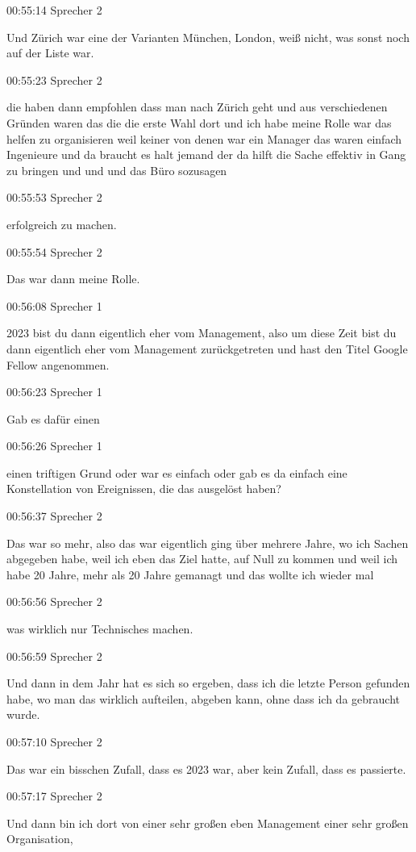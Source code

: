 00:55:14 Sprecher 2

Und Zürich war eine der Varianten München, London, weiß nicht, was sonst
noch auf der Liste war.

00:55:23 Sprecher 2

die haben dann empfohlen dass man nach Zürich geht und aus verschiedenen
Gründen waren das die die erste Wahl dort und ich habe meine Rolle war
das helfen zu organisieren weil keiner von denen war ein Manager das
waren einfach Ingenieure und da braucht es halt jemand der da hilft die
Sache effektiv in Gang zu bringen und und und das Büro sozusagen

00:55:53 Sprecher 2

erfolgreich zu machen.

00:55:54 Sprecher 2

Das war dann meine Rolle.

00:56:08 Sprecher 1

2023 bist du dann eigentlich eher vom Management, also um diese Zeit
bist du dann eigentlich eher vom Management zurückgetreten und hast den
Titel Google Fellow angenommen.

00:56:23 Sprecher 1

Gab es dafür einen

00:56:26 Sprecher 1

einen triftigen Grund oder war es einfach oder gab es da einfach eine
Konstellation von Ereignissen, die das ausgelöst haben?

00:56:37 Sprecher 2

Das war so mehr, also das war eigentlich ging über mehrere Jahre, wo ich
Sachen abgegeben habe, weil ich eben das Ziel hatte, auf Null zu kommen
und weil ich habe 20 Jahre, mehr als 20 Jahre gemanagt und das wollte
ich wieder mal

00:56:56 Sprecher 2

was wirklich nur Technisches machen.

00:56:59 Sprecher 2

Und dann in dem Jahr hat es sich so ergeben, dass ich die letzte Person
gefunden habe, wo man das wirklich aufteilen, abgeben kann, ohne dass
ich da gebraucht wurde.

00:57:10 Sprecher 2

Das war ein bisschen Zufall, dass es 2023 war, aber kein Zufall, dass es
passierte.

00:57:17 Sprecher 2

Und dann bin ich dort von einer sehr großen eben Management einer sehr
großen Organisation,

